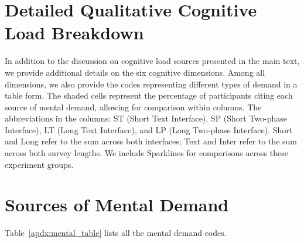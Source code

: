 \section{Detailed Qualitative Cognitive Load Breakdown}
\label{apdx:cog_qual}

In addition to the discussion on cognitive load sources presented in the main text, we provide additional details on the six cognitive dimensions. Among all dimensions, we also provide the codes representing different types of demand in a table form. The shaded cells represent the percentage of participants citing each source of mental demand, allowing for comparison within columns. The abbreviations in the columns: ST (Short Text Interface), SP (Short Two-phase Interface), LT (Long Text Interface), and LP (Long Two-phase Interface). Short and Long refer to the sum across both interfaces; Text and Inter refer to the sum across both survey lengths. We include Sparklines for comparisons across these experiment groups.

\section{Sources of Mental Demand}
\label{apdx:mental}
Table~\ref{apdx:mental_table} lists all the mental demand codes.

